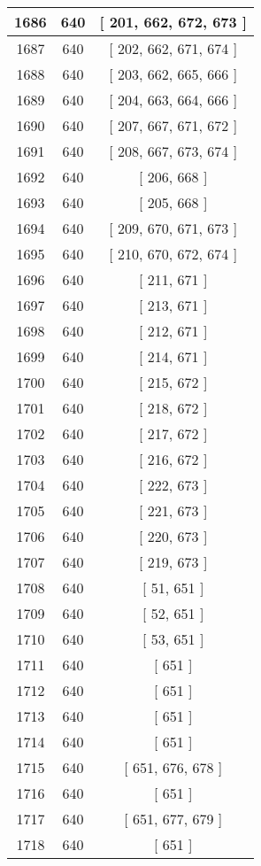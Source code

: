 \begin{center}
\begin{longtable}[H]{|| c c c ||}
\hline
1686 & 640 & [ 201, 662, 672, 673 ] \\ 
\hline
1687 & 640 & [ 202, 662, 671, 674 ] \\ 
\hline
1688 & 640 & [ 203, 662, 665, 666 ] \\ 
\hline
1689 & 640 & [ 204, 663, 664, 666 ] \\ 
\hline
1690 & 640 & [ 207, 667, 671, 672 ] \\ 
\hline
1691 & 640 & [ 208, 667, 673, 674 ] \\ 
\hline
1692 & 640 & [ 206, 668 ] \\ 
\hline
1693 & 640 & [ 205, 668 ] \\ 
\hline
1694 & 640 & [ 209, 670, 671, 673 ] \\ 
\hline
1695 & 640 & [ 210, 670, 672, 674 ] \\ 
\hline
1696 & 640 & [ 211, 671 ] \\ 
\hline
1697 & 640 & [ 213, 671 ] \\ 
\hline
1698 & 640 & [ 212, 671 ] \\ 
\hline
1699 & 640 & [ 214, 671 ] \\ 
\hline
1700 & 640 & [ 215, 672 ] \\ 
\hline
1701 & 640 & [ 218, 672 ] \\ 
\hline
1702 & 640 & [ 217, 672 ] \\ 
\hline
1703 & 640 & [ 216, 672 ] \\ 
\hline
1704 & 640 & [ 222, 673 ] \\ 
\hline
1705 & 640 & [ 221, 673 ] \\ 
\hline
1706 & 640 & [ 220, 673 ] \\ 
\hline
1707 & 640 & [ 219, 673 ] \\ 
\hline
1708 & 640 & [ 51, 651 ] \\ 
\hline
1709 & 640 & [ 52, 651 ] \\ 
\hline
1710 & 640 & [ 53, 651 ] \\ 
\hline
1711 & 640 & [ 651 ] \\ 
\hline
1712 & 640 & [ 651 ] \\ 
\hline
1713 & 640 & [ 651 ] \\ 
\hline
1714 & 640 & [ 651 ] \\ 
\hline
1715 & 640 & [ 651, 676, 678 ] \\ 
\hline
1716 & 640 & [ 651 ] \\ 
\hline
1717 & 640 & [ 651, 677, 679 ] \\ 
\hline
1718 & 640 & [ 651 ] \\ 
\hline

\end{longtable}
\end{center}
